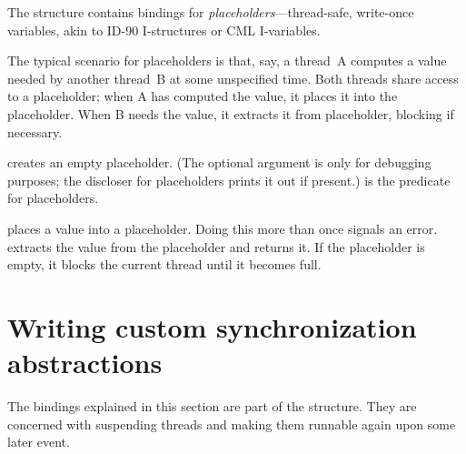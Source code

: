The  structure contains bindings for
\textit{placeholders}---thread-safe, write-once variables, akin to
ID-90 I-structures or CML I-variables.

The typical scenario for placeholders is that, say, a thread~A
computes a value needed by another thread~B at some unspecified time.
Both threads share access to a placeholder; when A has computed the
value, it places it into the placeholder.  When B needs the value, it
extracts it from placeholder, blocking if necessary.
%
\begin{protos}
\end{protos}
%
 creates an empty placeholder.  (The optional
 argument is only for debugging purposes; the discloser for
placeholders prints it out if present.)   is the
predicate for placeholders.

 places a value into a placeholder.  Doing this
more than once signals an error.   extracts
the value from the placeholder and returns it.  If the placeholder is
empty, it blocks the current thread until it becomes full.



\section{Writing custom synchronization abstractions}

The bindings explained in this section are part of the
 structure.  They are concerned with suspending
threads and making them runnable again upon some later event.

